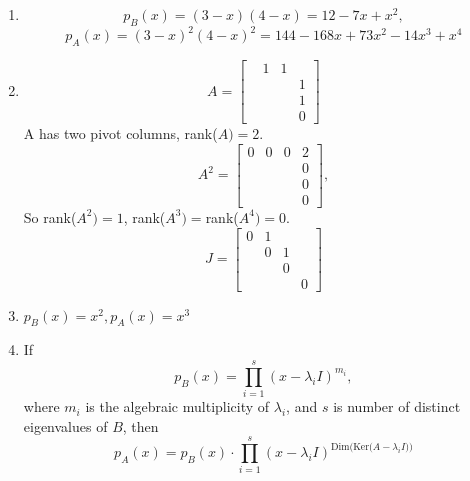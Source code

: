 \documentclass{article}
\begin{document}
\begin{enumerate}
    \item
    \[p_B(x)=(3-x)(4-x)=12-7x+x^2,\]
    \[p_A(x)=(3-x)^2(4-x)^2=144-168x+73x^2-14x^3+x^4\]
    \item 
    \[A=\left[
    \begin{array}{cccc}
    &1&1\\&&&1\\&&&1\\&&&0
    \end{array}
    \right]\]
    A has two pivot columns, rank($A)=2$.\\
    \[A^2=\left[
    \begin{array}{cccc}
    0&0&0&2\\&&&0\\&&&0\\&&&0
    \end{array}
    \right],\]
    So rank($A^2)=1$, rank($A^3)=$rank($A^4)=0$.
    \[J=\left[
    \begin{array}{cccc}
    0&1\\&0&1\\&&0\\&&&0
    \end{array}
    \right]\]
    \item $p_B(x)=x^2,p_A(x)=x^3$
    \item If 
    \[p_B(x)=\prod_{i=1}^s (x-\lambda_i I)^{m_i},\]
    where $m_i$ is the algebraic multiplicity of $\lambda_i$, and $s$ is number of distinct eigenvalues of $B$, then
    \[p_A(x)=p_B(x)\cdot\prod_{i=1}^s(x-\lambda_i I)^{\mathrm{Dim(Ker(}A-\lambda_i I))}\]
\end{enumerate}
\end{document}
